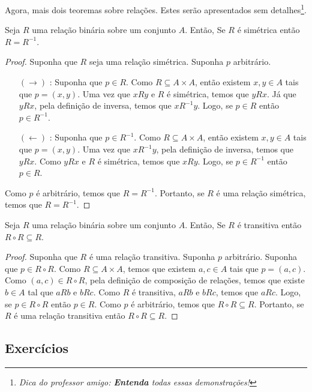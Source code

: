 Agora, mais dois teoremas sobre relações. Estes serão apresentados sem
detalhes\footnote{\textit{Dica do professor amigo: \textbf{Entenda} todas essas demonstrações!}}.
\begin{Theorem}
Seja $R$ uma relação binária sobre um conjunto $A$. Então,
Se $R$ é simétrica então $R = R^{-1}$.
\end{Theorem}
\begin{proof}
Suponha que $R$ seja uma relação simétrica. Suponha $p$ arbitrário.
\begin{itemize}
  \item[$(\to)$]: Suponha que $p \in R$. Como $R\subseteq A \times A$,
    então existem $x,y \in A$ tais que $p = (x,y)$. Uma vez que $
    xRy$ e $R$ é simétrica, temos que $yRx$. Já que $yRx$, pela
    definição de inversa, temos que $xR^{-1}y$. Logo, se $p \in R$
    então $p\in R^{-1}$.
  \item[$(\leftarrow)$]: Suponha que $p \in R^{-1}$. Como $R\subseteq
    A \times A$, então existem $x,y \in A$ tais que $p = (x,y)$. Uma
    vez que $xR^{-1}y$, pela definição de inversa, temos que
    $yRx$. Como $yRx$ e $R$ é simétrica, temos que $xRy$. Logo, se $p
    \in R^{-1}$ então $p \in R$.
\end{itemize}
Como $p$ é arbitrário, temos que $R = R^{-1}$. Portanto, se $R$ é uma
relação simétrica, temos que $R = R^{-1}$.
\end{proof}
\begin{Theorem}
Seja $R$ uma relação binária sobre um conjunto $A$. Então,
Se $R$ é transitiva então $R \circ R \subseteq R$.
\end{Theorem}
\begin{proof}
Suponha que $R$ é uma relação transitiva. Suponha $p$ arbitrário.
Suponha que $p \in R \circ R$. Como $R\subseteq A
    \times A$, temos que existem $a,c \in A$ tais que $p =
    (a,c)$. Como $(a,c) \in R\circ R$, pela definição de composição de
    relações, temos que existe $b\in A$ tal que $aRb$ e $bRc$. Como
    $R$ é transitiva, $aRb$ e $bRc$, temos que $aRc$. Logo, se $p \in
    R \circ R$ então $p\in R$. Como $p$ é arbitrário, temos que $R\circ R
    \subseteq R$. Portanto, se $R$ é uma relação transitiva então $R
    \circ R \subseteq R$.
\end{proof}


\subsection{Exercícios}

